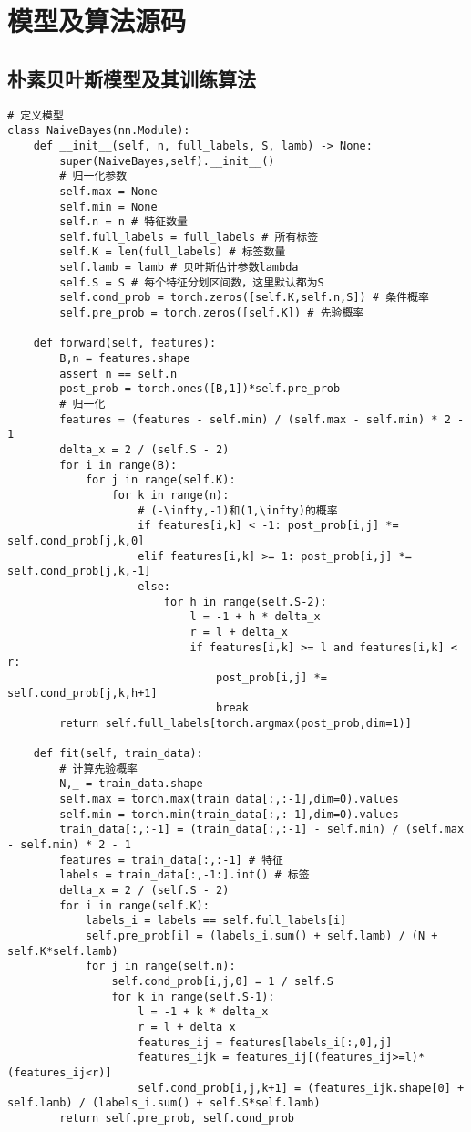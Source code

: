 \section{模型及算法源码}\label{appendix}

\subsection{朴素贝叶斯模型及其训练算法}
\begin{lstlisting}[caption = 朴素贝叶斯模型及其训练算法实现]
# 定义模型
class NaiveBayes(nn.Module):
    def __init__(self, n, full_labels, S, lamb) -> None:
        super(NaiveBayes,self).__init__()
        # 归一化参数
        self.max = None
        self.min = None
        self.n = n # 特征数量
        self.full_labels = full_labels # 所有标签
        self.K = len(full_labels) # 标签数量
        self.lamb = lamb # 贝叶斯估计参数lambda
        self.S = S # 每个特征分划区间数，这里默认都为S
        self.cond_prob = torch.zeros([self.K,self.n,S]) # 条件概率
        self.pre_prob = torch.zeros([self.K]) # 先验概率

    def forward(self, features):
        B,n = features.shape
        assert n == self.n
        post_prob = torch.ones([B,1])*self.pre_prob
        # 归一化
        features = (features - self.min) / (self.max - self.min) * 2 - 1
        delta_x = 2 / (self.S - 2)
        for i in range(B):
            for j in range(self.K):
                for k in range(n):
                    # (-\infty,-1)和(1,\infty)的概率
                    if features[i,k] < -1: post_prob[i,j] *= self.cond_prob[j,k,0]
                    elif features[i,k] >= 1: post_prob[i,j] *= self.cond_prob[j,k,-1]
                    else:
                        for h in range(self.S-2):
                            l = -1 + h * delta_x
                            r = l + delta_x
                            if features[i,k] >= l and features[i,k] < r:
                                post_prob[i,j] *= self.cond_prob[j,k,h+1]
                                break
        return self.full_labels[torch.argmax(post_prob,dim=1)]

    def fit(self, train_data):
        # 计算先验概率
        N,_ = train_data.shape
        self.max = torch.max(train_data[:,:-1],dim=0).values
        self.min = torch.min(train_data[:,:-1],dim=0).values
        train_data[:,:-1] = (train_data[:,:-1] - self.min) / (self.max - self.min) * 2 - 1
        features = train_data[:,:-1] # 特征
        labels = train_data[:,-1:].int() # 标签
        delta_x = 2 / (self.S - 2)
        for i in range(self.K):
            labels_i = labels == self.full_labels[i]
            self.pre_prob[i] = (labels_i.sum() + self.lamb) / (N + self.K*self.lamb)
            for j in range(self.n):
                self.cond_prob[i,j,0] = 1 / self.S
                for k in range(self.S-1):
                    l = -1 + k * delta_x
                    r = l + delta_x
                    features_ij = features[labels_i[:,0],j]
                    features_ijk = features_ij[(features_ij>=l)*(features_ij<r)]
                    self.cond_prob[i,j,k+1] = (features_ijk.shape[0] + self.lamb) / (labels_i.sum() + self.S*self.lamb)
        return self.pre_prob, self.cond_prob
\end{lstlisting}

